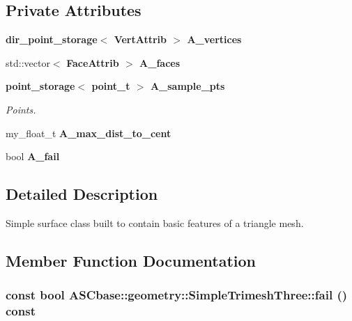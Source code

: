 \subsection*{Private Attributes}
\begin{CompactItemize}
\item 
\bf{dir\_\-point\_\-storage}$<$ \bf{Vert\-Attrib} $>$ \textbf{A\_\-vertices}\label{classASCbase_1_1geometry_1_1SimpleTrimeshThree_f8f2de92be2e2a5891d86f1a048869e2}

\item 
std::vector$<$ \bf{Face\-Attrib} $>$ \textbf{A\_\-faces}\label{classASCbase_1_1geometry_1_1SimpleTrimeshThree_f5848e48e7d8ca9a90f658906b2fdbbb}

\item 
\bf{point\_\-storage}$<$ \bf{point\_\-t} $>$ \bf{A\_\-sample\_\-pts}\label{classASCbase_1_1geometry_1_1SimpleTrimeshThree_17dfc1cc8ca141a236a54665b14c43eb}

\begin{CompactList}\small\item\em Points. \item\end{CompactList}\item 
my\_\-float\_\-t \textbf{A\_\-max\_\-dist\_\-to\_\-cent}\label{classASCbase_1_1geometry_1_1SimpleTrimeshThree_5ca5a91997f308b970217f23fa51401c}

\item 
bool \textbf{A\_\-fail}\label{classASCbase_1_1geometry_1_1SimpleTrimeshThree_773f3c715fcc91004e1fe529c0c79be2}

\end{CompactItemize}


\subsection{Detailed Description}
Simple surface class built to contain basic features of a triangle mesh. 



\subsection{Member Function Documentation}
\subsubsection{\setlength{\rightskip}{0pt plus 5cm}const bool ASCbase::geometry::Simple\-Trimesh\-Three::fail () const\hspace{0.3cm}{\tt  [inline]}}\label{classASCbase_1_1geometry_1_1SimpleTrimeshThree_2e9bb6efe1d7ed203ac88caa6a1e0b96}


